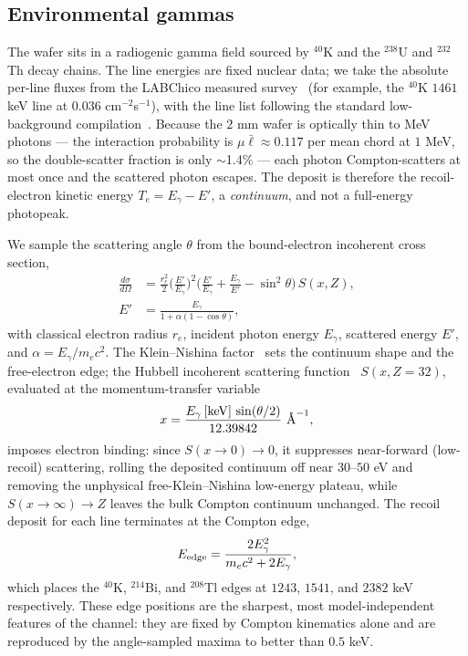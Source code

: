 \subsection{Environmental gammas}

The wafer sits in a radiogenic gamma field sourced by $^{40}$K and the
$^{238}$U and $^{232}$Th decay chains. The line energies are fixed
nuclear data; we take the absolute per-line fluxes from the LABChico
measured survey~\cite{labchico2022} (for example, the $^{40}$K
$1461$ keV line at $0.036$ cm$^{-2}$s$^{-1}$), with the line list
following the standard low-background compilation~\cite{heusser1995}.
Because the $2$ mm wafer is optically thin to MeV photons --- the
interaction probability is $\mu\bar\ell\approx0.117$ per mean chord at
$1$ MeV, so the double-scatter fraction is only $\sim$1.4\% --- each
photon Compton-scatters at most once and the scattered photon escapes.
The deposit is therefore the recoil-electron kinetic energy
$T_e=E_\gamma-E'$, a \emph{continuum}, and not a full-energy photopeak.

We sample the scattering angle $\theta$ from the bound-electron
incoherent cross section,
\begin{equation}
\begin{aligned}
\frac{d\sigma}{d\Omega}
&=\frac{r_e^2}{2}\Big(\frac{E'}{E_\gamma}\Big)^{2}
\Big(\frac{E'}{E_\gamma}+\frac{E_\gamma}{E'}-\sin^2\theta\Big)\,S(x,Z),\\
E'&=\frac{E_\gamma}{1+\alpha(1-\cos\theta)},
\end{aligned}
\label{eq:kn}
\end{equation}
with classical electron radius $r_e$, incident photon energy $E_\gamma$,
scattered energy $E'$, and $\alpha=E_\gamma/m_ec^2$. The Klein--Nishina
factor~\cite{kleinnishina1929} sets the continuum shape and the
free-electron edge; the Hubbell incoherent scattering
function~\cite{hubbell1975} $S(x,Z\!=\!32)$, evaluated at the
momentum-transfer variable
\begin{equation}
x=\frac{E_\gamma\,[{\rm keV}]\,\sin(\theta/2)}{12.39842}~\text{\AA}^{-1},
\label{eq:momtransfer}
\end{equation}
imposes electron binding: since $S(x\!\to\!0)\to0$, it suppresses
near-forward (low-recoil) scattering, rolling the deposited continuum off
near $30$--$50$ eV and removing the unphysical free-Klein--Nishina
low-energy plateau, while $S(x\!\to\!\infty)\to Z$ leaves the bulk
Compton continuum unchanged. The recoil deposit for each line terminates
at the Compton edge,
\begin{equation}
E_{\rm edge}=\frac{2E_\gamma^2}{m_ec^2+2E_\gamma},
\label{eq:comptonedge}
\end{equation}
which places the $^{40}$K, $^{214}$Bi, and $^{208}$Tl edges at $1243$,
$1541$, and $2382$ keV respectively. These edge positions are the
sharpest, most model-independent features of the channel: they are fixed
by Compton kinematics alone and are reproduced by the angle-sampled
maxima to better than $0.5$ keV.

